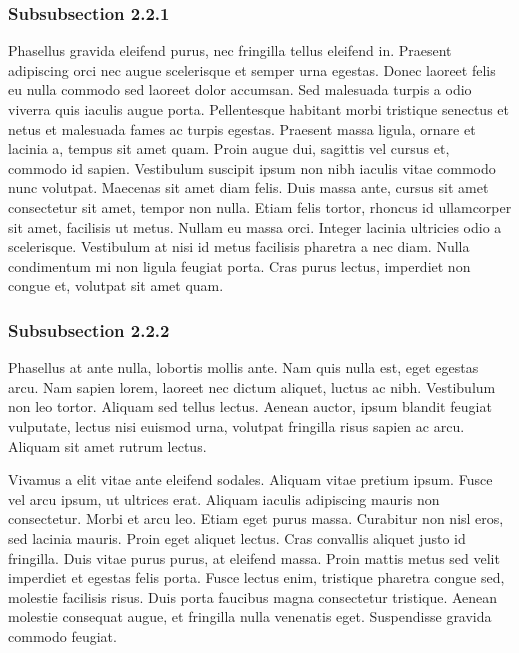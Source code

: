 \begin{multicols}{2}
\subsubsection{Subsubsection 2.2.1}
Phasellus gravida eleifend purus, nec
fringilla tellus eleifend in. Praesent adipiscing orci nec augue scelerisque et semper urna egestas. Donec laoreet felis eu nulla commodo sed laoreet dolor accumsan. Sed malesuada turpis a odio viverra quis iaculis augue porta. Pellentesque habitant morbi tristique senectus et netus et malesuada fames ac turpis egestas. Praesent massa ligula, ornare et lacinia a, tempus sit amet quam. Proin augue dui, sagittis vel cursus et, commodo id sapien. Vestibulum suscipit ipsum non nibh iaculis vitae commodo nunc volutpat. Maecenas sit amet diam felis. Duis massa ante, cursus sit amet consectetur sit amet, tempor non nulla. Etiam felis tortor, rhoncus id ullamcorper sit amet, facilisis ut metus. Nullam eu massa orci. Integer lacinia ultricies odio a scelerisque. Vestibulum at nisi id metus facilisis pharetra a nec diam. Nulla condimentum mi non ligula feugiat porta. Cras purus lectus, imperdiet non congue et, volutpat sit amet quam.

\subsubsection{Subsubsection 2.2.2}

Phasellus at ante nulla, lobortis mollis ante. Nam quis nulla est, eget egestas arcu. Nam sapien lorem, laoreet nec dictum aliquet, luctus ac nibh. Vestibulum non leo tortor. Aliquam sed tellus lectus. Aenean auctor, ipsum blandit feugiat vulputate, lectus nisi euismod urna, volutpat fringilla risus sapien ac arcu. Aliquam sit amet rutrum lectus.

Vivamus a elit vitae ante eleifend sodales. Aliquam vitae pretium ipsum. Fusce vel arcu ipsum, ut ultrices erat. Aliquam iaculis adipiscing mauris non consectetur. Morbi et arcu leo. Etiam eget purus massa. Curabitur non nisl eros, sed lacinia mauris. Proin eget aliquet lectus. Cras convallis aliquet justo id fringilla. Duis vitae purus purus, at eleifend massa. Proin mattis metus sed velit imperdiet et egestas felis porta. Fusce lectus enim, tristique pharetra congue sed, molestie facilisis risus. Duis porta faucibus magna consectetur tristique. Aenean molestie consequat augue, et fringilla nulla venenatis eget. Suspendisse gravida commodo feugiat.


\end{multicols}
